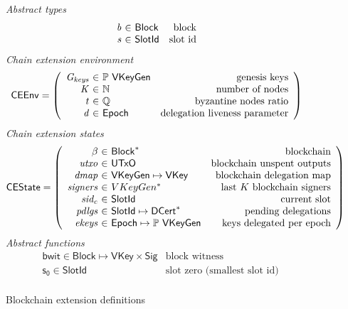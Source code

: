 \documentclass[11pt,a4paper]{article}
\newcommand{\powerset}[1]{\mathbb{P}~#1}
\newcommand{\var}[1]{\mathit{#1}}
\newcommand{\fun}[1]{\mathsf{#1}}
\newcommand{\type}[1]{\mathsf{#1}}
\newcommand{\seqof}[1]{#1^{*}}
\newcommand{\UTxO}{\type{UTxO}}
\newcommand{\VKey}{\type{VKey}}
\newcommand{\Sig}{\type{Sig}}
\newcommand{\DCert}{\type{DCert}}
\newcommand{\Epoch}{\type{Epoch}}
\newcommand{\VKeyGen}{\type{VKeyGen}}
\newcommand{\Gkeys}{\var{G_{keys}}}
\newcommand{\Block}{\type{Block}}
\newcommand{\SlotId}{\type{SlotId}}
\newcommand{\CEEnv}{\type{CEEnv}}
\newcommand{\CEState}{\type{CEState}}
\begin{document}
\begin{figure}
  \emph{Abstract types}
  \begin{equation*}
    \begin{array}{r@{~\in~}lr}
      \var{b} & \Block & \text{block}\\
      \var{s} & \SlotId & \text{slot id}\\
    \end{array}
  \end{equation*}
  \emph{Chain extension environment}
  \begin{equation*}
    \CEEnv =
    \left(
      \begin{array}{r@{~\in~}lr}
        \var{\Gkeys} & \powerset{\VKeyGen} & \text{genesis keys}\\
        \var{K} & \mathbb{N} & \text{number of nodes}\\
        \var{t} & \mathbb{Q} & \text{byzantine nodes ratio}\\
        \var{d} & \Epoch & \text{delegation liveness parameter}\\
      \end{array}
    \right)
  \end{equation*}
  \emph{Chain extension states}
  \begin{equation*}
    \CEState =
    \left(
      \begin{array}{r@{~\in~}lr}
        \beta & \seqof{\Block} & \text{blockchain}\\
        \var{utxo} & \UTxO & \text{blockchain unspent outputs}\\
        \var{dmap} & \VKeyGen \mapsto \VKey & \text{blockchain delegation map}\\
        \var{signers} & \seqof{VKeyGen} & \text{last $K$ blockchain signers}\\
        \var{sid_c} & \SlotId & \text{current slot}\\
        \var{pdlgs} & \SlotId \mapsto \seqof{\DCert} & \text{pending delegations}\\
        \var{ekeys} & \Epoch \mapsto \powerset{\VKeyGen} & \text{keys delegated per epoch}
      \end{array}
    \right)
  \end{equation*}
  \emph{Abstract functions}
  \begin{align*}
    & \fun{bwit} \in \Block \mapsto \VKey \times \Sig & \text{block witness}\\
    & \fun{s_0} \in \SlotId  & \text{slot zero (smallest slot id)}\\
  \end{align*}
  \caption{Blockchain extension definitions}
  \label{fig:chain-extension-defs}
\end{figure}
\end{document}

